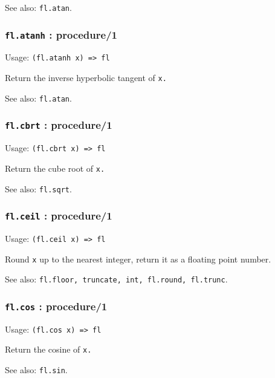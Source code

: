 \documentclass[
]{article}
\newcommand{\passthrough}[1]{#1}
\begin{document}
See also: \passthrough{\lstinline!fl.atan!}.

\hypertarget{fl.atanh-procedure1}{%
\subsubsection{\texorpdfstring{\texttt{fl.atanh} :
procedure/1}{fl.atanh : procedure/1}}\label{fl.atanh-procedure1}}

Usage: \passthrough{\lstinline!(fl.atanh x) => fl!}

Return the inverse hyperbolic tangent of \passthrough{\lstinline!x.!}

See also: \passthrough{\lstinline!fl.atan!}.

\hypertarget{fl.cbrt-procedure1}{%
\subsubsection{\texorpdfstring{\texttt{fl.cbrt} :
procedure/1}{fl.cbrt : procedure/1}}\label{fl.cbrt-procedure1}}

Usage: \passthrough{\lstinline!(fl.cbrt x) => fl!}

Return the cube root of \passthrough{\lstinline!x.!}

See also: \passthrough{\lstinline!fl.sqrt!}.

\hypertarget{fl.ceil-procedure1}{%
\subsubsection{\texorpdfstring{\texttt{fl.ceil} :
procedure/1}{fl.ceil : procedure/1}}\label{fl.ceil-procedure1}}

Usage: \passthrough{\lstinline!(fl.ceil x) => fl!}

Round \passthrough{\lstinline!x!} up to the nearest integer, return it
as a floating point number.

See also:
\passthrough{\lstinline!fl.floor, truncate, int, fl.round, fl.trunc!}.

\hypertarget{fl.cos-procedure1}{%
\subsubsection{\texorpdfstring{\texttt{fl.cos} :
procedure/1}{fl.cos : procedure/1}}\label{fl.cos-procedure1}}

Usage: \passthrough{\lstinline!(fl.cos x) => fl!}

Return the cosine of \passthrough{\lstinline!x.!}

See also: \passthrough{\lstinline!fl.sin!}.
\end{document}
